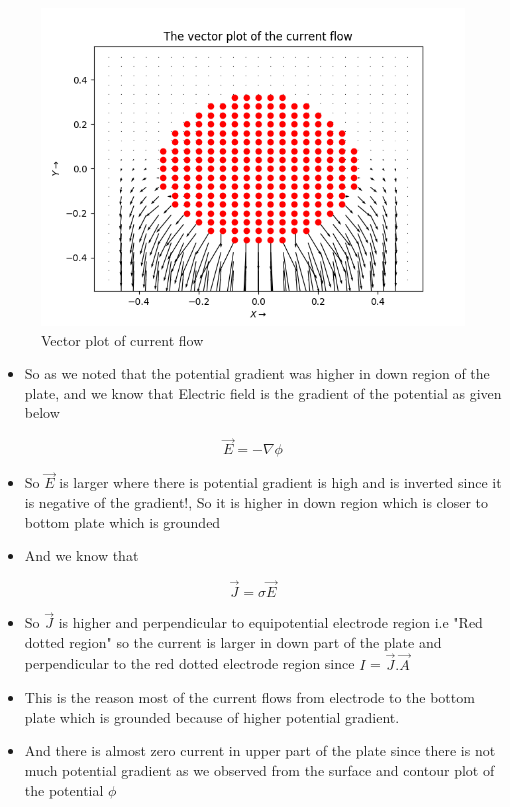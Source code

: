 \documentclass[11pt, a4paper]{article}
\begin{document}
  \begin{figure}[!tbh]
   \centering
   \includegraphics[scale=0.8]{Figure_0.png}  
   \caption{Vector plot of current flow}
  \end{figure}
  

  \begin{itemize}
  \item
    So as we noted that the potential gradient was higher in down region
    of the plate, and we know that Electric field is the gradient of the
    potential as given below
  \end{itemize}
  
  \begin{equation}
  \vec{E} = -\nabla{\phi}
     \end{equation}
  
  \begin{itemize}
  \item
    So \(\vec{E}\) is larger where there is potential gradient is high and
    is inverted since it is negative of the gradient!, So it is higher in
    down region which is closer to bottom plate which is grounded
  \item
    And we know that
  \end{itemize}
  
  \begin{equation}
  \vec{J} = \sigma\vec{E}
     \end{equation}
  
  \begin{itemize}
  \item
    So \(\vec{J}\) is higher and perpendicular to equipotential electrode
    region i.e "Red dotted region" so the current is larger in down part
    of the plate and perpendicular to the red dotted electrode region
    since \(I\) = \(\vec{J}.\vec{A}\)
  \item
   	This is the reason most of the current flows from electrode to the
    bottom plate which is grounded because of higher potential gradient.
  \item
    And there is almost zero current in upper part of the plate since
    there is not much potential gradient as we observed from the surface
    and contour plot of the potential \(\phi\)
  \end{itemize}
  
\end{document}
